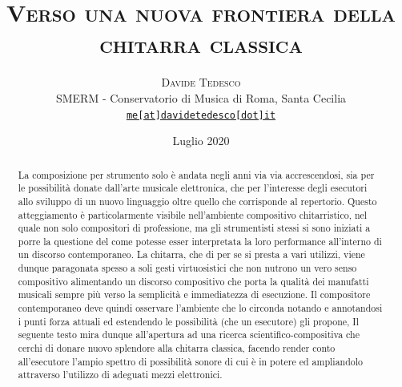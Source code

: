 \documentclass[oneside]{article}
\title{\vspace{-15mm}\fontsize{24pt}{10pt}\selectfont\textsf{\bfseries{\textsc{Verso una nuova frontiera della
 chitarra classica}}}} %
\author{
\large
\textsc{Davide Tedesco}\\
\small{SMERM - Conservatorio di Musica di Roma, Santa Cecilia}\\
\small \href{mailto:me@davidetedesco.it}{\texttt{me[at]davidetedesco[dot]it}} 
}
\date{Luglio 2020}
\begin{document}
\maketitle %

\tableofcontents

\thispagestyle{empty} 


\begin{abstract}

La composizione per strumento solo è andata negli anni via via accrescendosi, sia per le possibilità donate dall'arte musicale elettronica, che per l'interesse degli esecutori allo sviluppo di un nuovo linguaggio oltre quello che corrisponde al repertorio. Questo atteggiamento è particolarmente visibile nell'ambiente compositivo chitarristico, nel quale non solo compositori di professione, ma gli strumentisti stessi si sono iniziati a porre la questione del come potesse esser interpretata la loro performance all'interno di un discorso contemporaneo. La chitarra, che di per se si presta a vari utilizzi, viene dunque paragonata spesso a soli gesti virtuosistici che non nutrono un vero senso compositivo alimentando un discorso compositivo che porta la qualità dei manufatti musicali sempre più verso la semplicità e immediatezza di esecuzione. Il compositore contemporaneo deve quindi osservare l'ambiente che lo circonda notando e annotandosi i punti forza attuali ed estendendo le possibilità (che un esecutore) gli propone, Il seguente testo mira dunque all'apertura ad una ricerca scientifico-compositiva che cerchi di donare nuovo splendore alla chitarra classica, facendo render conto all'esecutore l'ampio spettro di possibilità sonore di cui è in potere ed ampliandolo attraverso l'utilizzo di adeguati mezzi elettronici.

\vspace*{4mm}
\end{abstract}


\hspace*{4mm}
\end{document}
